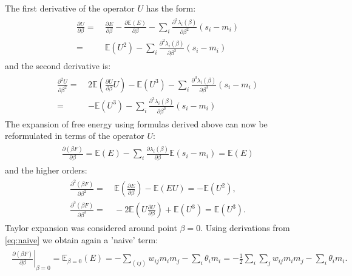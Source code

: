 \documentclass[../report/report.tex]{subfiles}
\begin{document}
The first derivative of the operator $U$ has the form:
\begin{align}
\begin{split}
\frac{\partial U}{\partial \beta}  =  ~&\frac{\partial E}{\partial \beta} - \frac{\partial \mathbb{E}(E)}{\partial \beta} - \sum_i \frac{\partial^2 \lambda_i (\beta)}{\partial \beta^2} (s_i - m_i)\\
= ~& \mathbb{E}(U^2) - \sum_i \frac{\partial^2 \lambda_i (\beta)}{\partial \beta^2} (s_i - m_i)
\end{split}
\end{align}
and the second derivative is:
\begin{align}
\begin{split}
\frac{\partial^2 U}{\partial \beta^2}  =  ~& 2 \mathbb{E}\left(\frac{\partial U}{\partial \beta}U  \right) - \mathbb{E}(U^3) - \sum_i \frac{\partial^3 \lambda_i (\beta)}{\partial \beta^3} (s_i - m_i) \\
= ~& - \mathbb{E}(U^3) - \sum_i \frac{\partial^3 \lambda_i (\beta)}{\partial \beta^3} (s_i - m_i)
\end{split}
\end{align}
The expansion of free energy using formulas derived above can now be reformulated in terms of the operator $U$:
\begin{align}
\begin{split}
 \frac{\partial (\beta F)}{\partial \beta} = \mathbb{E}(E) - \sum_i \frac{\partial\lambda_i (\beta)}{\partial \beta}\mathbb{E}(s_i - m_i) = \mathbb{E}(E) 
\end{split}
\label{eq:naive}
\end{align}
and the higher orders:
\begin{align}
\begin{split}
 \frac{\partial^2 (\beta F)}{\partial \beta^2} = &~ \mathbb{E}\left( \frac{\partial E}{\partial \beta} \right) - \mathbb{E}(EU) = - \mathbb{E}(U^2),\\
 \frac{\partial^3 (\beta F)}{\partial \beta^3}= &~ - 2\mathbb{E}\left( U \frac{\partial U}{\partial \beta} \right) + \mathbb{E}(U^3)  = \mathbb{E}(U^3).
  \label{eq:higherOrders}
\end{split}
\end{align}
Taylor expansion was considered around point $\beta =0$. Using derivations from \ref{eq:naive} we obtain again a 'naive' term:
\begin{align}
\begin{split}
\left. \frac{\partial (\beta F)}{\partial \beta} \right|_{\beta =0} = \mathbb{E} _{\beta = 0}(E) = - \sum_{(ij)} w_{ij} m_i m_j - \sum_i \theta_i m_i = - \frac{1}{2} \sum_i \sum_j w_{ij}m_i m_j - \sum_i \theta_i m_i.
\end{split}
\end{align}
\end{document}
